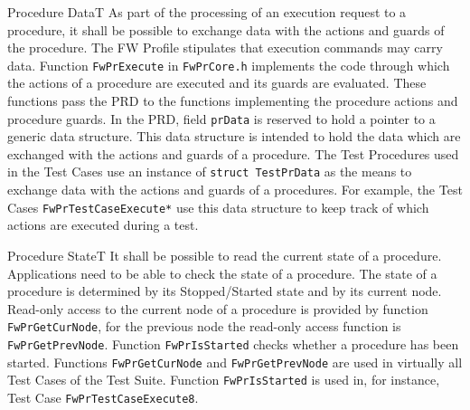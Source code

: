 \documentclass[requirements]{../fwprofile}
\begin{document}
\begin{fw_req}{Procedure Data}{T}
{As part of the processing of an execution request to a procedure, 
it shall be possible to exchange data with the actions and guards of the procedure.}
{The FW Profile stipulates that execution commands may carry data.}
{Function \texttt{FwPrExecute} in \texttt{FwPrCore.h} implements the 
code through which the actions of a procedure are executed and its guards are evaluated. 
These functions pass the PRD to the functions implementing the procedure actions and procedure 
guards. 
In the PRD, field \texttt{prData} is reserved to hold a pointer to a generic data structure. 
This data structure is intended to hold the data which are exchanged with the actions and guards 
of a procedure.} 
{The Test Procedures used in the Test Cases use an instance of 
\texttt{struct TestPrData} as the means to exchange data with the actions and guards of a 
procedures. 
For example, the Test Cases \texttt{FwPrTestCaseExecute*} use this data structure to keep 
track of which actions are executed during a test.}
\end{fw_req}


\begin{fw_req}{Procedure State}{T}
{It shall be possible to read the current state of a procedure.}
{Applications need to be able to check the state of a procedure.}
{The state of a procedure is determined by its Stopped/Started state and 
by its current node.
Read-only access to the current node of a procedure is provided by function 
\texttt{FwPrGetCurNode}, for the previous node the read-only access function is \texttt{FwPrGetPrevNode}.
Function \texttt{FwPrIsStarted} checks whether a procedure has been started.} 
{Functions \texttt{FwPrGetCurNode} and \texttt{FwPrGetPrevNode} are used in virtually all Test Cases of
the Test Suite. 
Function \texttt{FwPrIsStarted} is used in, for instance, Test Case \texttt{FwPrTestCaseExecute8}.}
\end{fw_req}
\end{document}
